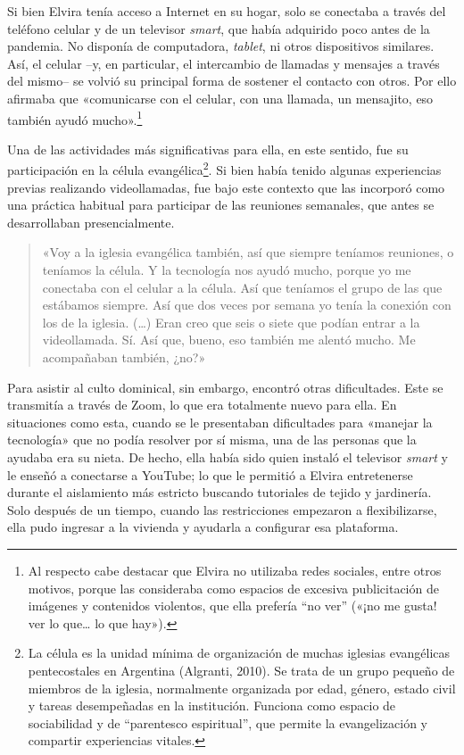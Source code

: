 Si bien Elvira tenía acceso a Internet en su hogar, solo se conectaba a través del teléfono celular y de un televisor \emph{smart}, que había adquirido poco antes de la pandemia. No disponía de computadora, \emph{tablet}, ni otros dispositivos similares. Así, el celular --y, en particular, el intercambio de llamadas y mensajes a través del mismo-- se volvió su principal forma de sostener el contacto con otros. Por ello afirmaba que «comunicarse con el celular, con una llamada, un mensajito, eso también ayudó mucho».\footnote{Al respecto cabe destacar que Elvira no utilizaba redes sociales, entre otros motivos, porque las consideraba como espacios de excesiva publicitación de imágenes y contenidos violentos, que ella prefería ``no ver'' («¡no me gusta! ver lo que\ldots{} lo que hay»).}

Una de las actividades más significativas para ella, en este sentido, fue su participación en la célula evangélica\footnote{La célula es la unidad mínima de organización de muchas iglesias evangélicas pentecostales en Argentina (Algranti, 2010). Se trata de un grupo pequeño de miembros de la iglesia, normalmente organizada por edad, género, estado civil y tareas desempeñadas en la institución. Funciona como espacio de sociabilidad y de ``parentesco espiritual'', que permite la evangelización y compartir experiencias vitales.}. Si bien había tenido algunas experiencias previas realizando videollamadas, fue bajo este contexto que las incorporó como una práctica habitual para participar de las reuniones semanales, que antes se desarrollaban presencialmente.

\begin{quote}
«Voy a la iglesia evangélica también, así que siempre teníamos reuniones, o teníamos la célula. Y la tecnología nos ayudó mucho, porque yo me conectaba con el celular a la célula. Así que teníamos el grupo de las que estábamos siempre. Así que dos veces por semana yo tenía la conexión con los de la iglesia. (\ldots) Eran creo que seis o siete que podían entrar a la videollamada. Sí. Así que, bueno, eso también me alentó mucho. Me acompañaban también, ¿no?»
\end{quote}

Para asistir al culto dominical, sin embargo, encontró otras dificultades. Este se transmitía a través de Zoom, lo que era totalmente nuevo para ella. En situaciones como esta, cuando se le presentaban dificultades para «manejar la tecnología» que no podía resolver por sí misma, una de las personas que la ayudaba era su nieta. De hecho, ella había sido quien instaló el televisor \emph{smart} y le enseñó a conectarse a YouTube; lo que le permitió a Elvira entretenerse durante el aislamiento más estricto buscando tutoriales de tejido y jardinería. Solo después de un tiempo, cuando las restricciones empezaron a flexibilizarse, ella pudo ingresar a la vivienda y ayudarla a configurar esa plataforma.

